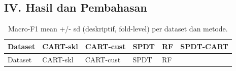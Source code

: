 \documentclass[
  conference]{IEEEtran}
\begin{document}
\subsection{IV. Hasil dan Pembahasan}\label{iv.-hasil-dan-pembahasan}

\begin{longtable}[]{@{}
  >{\raggedright\arraybackslash}p{}
  >{\raggedright\arraybackslash}p{}
  >{\raggedright\arraybackslash}p{}
  >{\raggedright\arraybackslash}p{}
  >{\raggedright\arraybackslash}p{}
  >{\raggedright\arraybackslash}p{}@{}}
\caption{Macro-F1 mean +/- sd (deskriptif, fold-level) per dataset dan
metode.}\tabularnewline
\toprule\noalign{}
\begin{minipage}[b]{\linewidth}\raggedright
Dataset
\end{minipage} & \begin{minipage}[b]{\linewidth}\raggedright
CART-skl
\end{minipage} & \begin{minipage}[b]{\linewidth}\raggedright
CART-cust
\end{minipage} & \begin{minipage}[b]{\linewidth}\raggedright
SPDT
\end{minipage} & \begin{minipage}[b]{\linewidth}\raggedright
RF
\end{minipage} & \begin{minipage}[b]{\linewidth}\raggedright
SPDT-CART
\end{minipage} \\
\midrule\noalign{}
\endfirsthead
\toprule\noalign{}
\begin{minipage}[b]{\linewidth}\raggedright
Dataset
\end{minipage} & \begin{minipage}[b]{\linewidth}\raggedright
CART-skl
\end{minipage} & \begin{minipage}[b]{\linewidth}\raggedright
CART-cust
\end{minipage} & \begin{minipage}[b]{\linewidth}\raggedright
SPDT
\end{minipage} & \begin{minipage}[b]{\linewidth}\raggedright
RF
\end{minipage} & \begin{minipage}[b]{\linewidth}\raggedright

\end{minipage}
\end{longtable}
\end{document}
